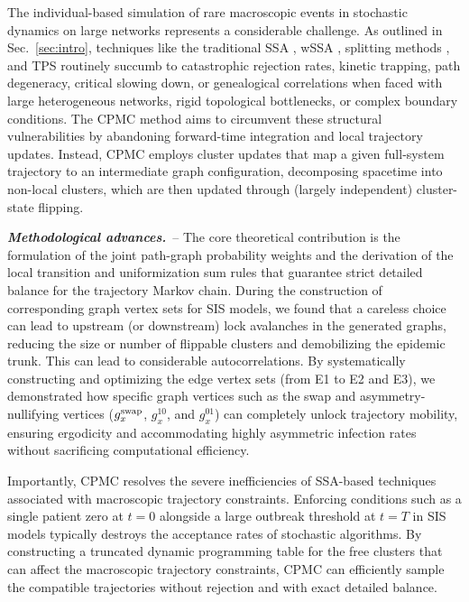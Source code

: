 \documentclass[english,10pt,aps,pra,twocolumn,superscriptaddress,floatfix,fleqn]{revtex4-2}
\newcommand{\swap}{\textnormal{swap}}
\newcommand{\Emph}[1]{\emph{\textbf{#1}}}
\begin{document}
The individual-based simulation of rare macroscopic events in stochastic dynamics on large networks represents a considerable challenge. As outlined in Sec.~\ref{sec:intro}, techniques like the traditional SSA \cite{Gillespie1977-81}, wSSA \cite{Kuwahara2008-129,Gillespie2009-130}, splitting methods 
\cite{Allen2009-21,VillenAltamirano2002-13,Zuckerman2017-46,Aristoff2018-52}, and TPS \cite{Bolhuis2002-53,Dellago2002-1,Bolhuis2021-4} routinely succumb to catastrophic rejection rates, kinetic trapping, path degeneracy, critical slowing down, or genealogical correlations when faced with large heterogeneous networks, rigid topological bottlenecks, or complex boundary conditions. 
The CPMC method aims to circumvent these structural vulnerabilities by abandoning forward-time integration and local trajectory updates. Instead, CPMC employs cluster updates that map a given full-system trajectory to an intermediate graph configuration, decomposing spacetime into non-local clusters, which are then updated through (largely independent) cluster-state flipping.

\Emph{Methodological advances.}~-- 
The core theoretical contribution is the formulation of the joint path-graph probability weights and the derivation of the local transition and uniformization sum rules that guarantee strict detailed balance for the trajectory Markov chain. During the construction of corresponding graph vertex sets for SIS models, we found that a careless choice can lead to upstream (or downstream) lock avalanches in the generated graphs, reducing the size or number of flippable clusters and demobilizing the epidemic trunk. This can lead to considerable autocorrelations. By systematically constructing and optimizing the edge vertex sets (from \textsc{E1} to \textsc{E2} and \textsc{E3}), we demonstrated how specific graph vertices such as the swap and asymmetry-nullifying vertices ($g^\swap_x$, $g^{10}_x$, and $g^{01}_x$) can completely unlock trajectory mobility, ensuring ergodicity and accommodating highly asymmetric infection rates without sacrificing computational efficiency.

Importantly, CPMC resolves the severe inefficiencies of SSA-based techniques associated with macroscopic trajectory constraints. Enforcing conditions such as a single patient zero at $t=0$ alongside a large outbreak threshold at $t=T$ in SIS models typically destroys the acceptance rates of stochastic algorithms. By constructing a truncated dynamic programming table \cite{Martello1990,Kellerer2004} for the free clusters that can affect the macroscopic trajectory constraints, CPMC can efficiently sample the compatible trajectories without rejection and with exact detailed balance.
\end{document}
